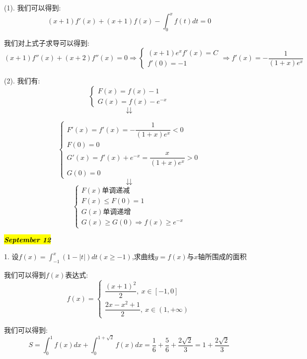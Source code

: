 \begin{solution}

	(1). 我们可以得到:  
	$$(x+1)f'(x)+(x+1)f(x)-\int_{0}^{x}f(t)dt=0$$
	
	我们对上式子求导可以得到:  
	$$(x+1)f''(x)+(x+2)f''(x)=0\Rightarrow \left\lbrace 
	\begin{array}{l}
		(x+1)e^{x}f'(x)=C\\
		f'(0)=-1
	\end{array}
	\right. \Rightarrow f'(x)=-\dfrac{1}{(1+x)e^{x}}$$
	
	(2). 我们有:  $$\left\lbrace 
	\begin{array}{l}
		F(x)=f(x)-1\\
		G(x)=f(x)-e^{-x}
	\end{array}
	\right.$$
	$$\downdownarrows$$ 
	
	$$\left\lbrace 
	\begin{array}{l}
		F'(x)=f'(x)=-\dfrac{1}{(1+x)e^{x}}<0\\
		F(0)=0\\
		G'(x)=f'(x)+e^{-x}=\dfrac{x}{(1+x)e^{x}}>0\\
		G(0)=0
	\end{array}
	\right.$$ 
	$$\downdownarrows$$ 
	$$\left\lbrace 
	\begin{array}{l}
		F(x)\text{单调递减}\\
		F(x)\leq F(0)=1\\
		G(x)\text{单调递增}\\
		G(x)\geq G(0)\Rightarrow f(x)\geq e^{-x}
	\end{array}
	\right. $$
\end{solution}

\hl{\textbf{\textit{September 12}}}

1. 设$f(x)=\int_{-1}^{x}(1-|t|)dt(x\geq -1)$,求曲线$y=f(x)$与$x$轴所围成的面积

\begin{solution}

	我们可以得到$f(x)$表达式:  
	$$f(x)=\left\lbrace 
	\begin{array}{l}
		\dfrac{(x+1)^2}{2},\ x\in[-1,0]\\
		\dfrac{2x-x^2+1}{2},\ x\in(1,+\infty)
	\end{array}
	\right. $$
	
	我们可以得到:  
	$$S=\int_{0}^{1}f(x)dx+\int_{0}^{1+\sqrt{2}}f(x)dx=\dfrac{1}{6}+\dfrac{5}{6}+\dfrac{2\sqrt{2}}{3}=1+\dfrac{2\sqrt{2}}{3}$$
\end{solution}

